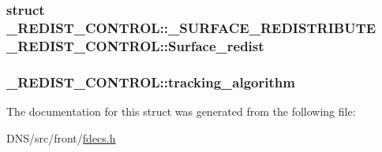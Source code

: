 \subsubsection[{\texorpdfstring{Surface\+\_\+redist}{Surface_redist}}]{\setlength{\rightskip}{0pt plus 5cm}struct {\bf \+\_\+\+R\+E\+D\+I\+S\+T\+\_\+\+C\+O\+N\+T\+R\+O\+L\+::\+\_\+\+S\+U\+R\+F\+A\+C\+E\+\_\+\+R\+E\+D\+I\+S\+T\+R\+I\+B\+U\+TE}  \+\_\+\+R\+E\+D\+I\+S\+T\+\_\+\+C\+O\+N\+T\+R\+O\+L\+::\+Surface\+\_\+redist}\hypertarget{struct___r_e_d_i_s_t___c_o_n_t_r_o_l_a29cd71a801bd2c91527ad5799c344962}{}\label{struct___r_e_d_i_s_t___c_o_n_t_r_o_l_a29cd71a801bd2c91527ad5799c344962}
\subsubsection[{\texorpdfstring{tracking\+\_\+algorithm}{tracking_algorithm}}]{ \+\_\+\+R\+E\+D\+I\+S\+T\+\_\+\+C\+O\+N\+T\+R\+O\+L\+::tracking\+\_\+algorithm}\hypertarget{struct___r_e_d_i_s_t___c_o_n_t_r_o_l_a95bacf880becf1b4a99976f595b10838}{}\label{struct___r_e_d_i_s_t___c_o_n_t_r_o_l_a95bacf880becf1b4a99976f595b10838}


The documentation for this struct was generated from the following file\+:\begin{DoxyCompactItemize}
\item 
D\+N\+S/src/front/\hyperlink{fdecs_8h}{fdecs.\+h}\end{DoxyCompactItemize}
